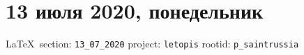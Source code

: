  
 

\section{13 июля 2020, понедельник}
\label{sec:13_07_2020}



\vspace{0.5cm}
{\ifDEBUG\small\LaTeX~section: \verb|13_07_2020| project: \verb|letopis| rootid: \verb|p_saintrussia|\fi}
\vspace{0.5cm}

